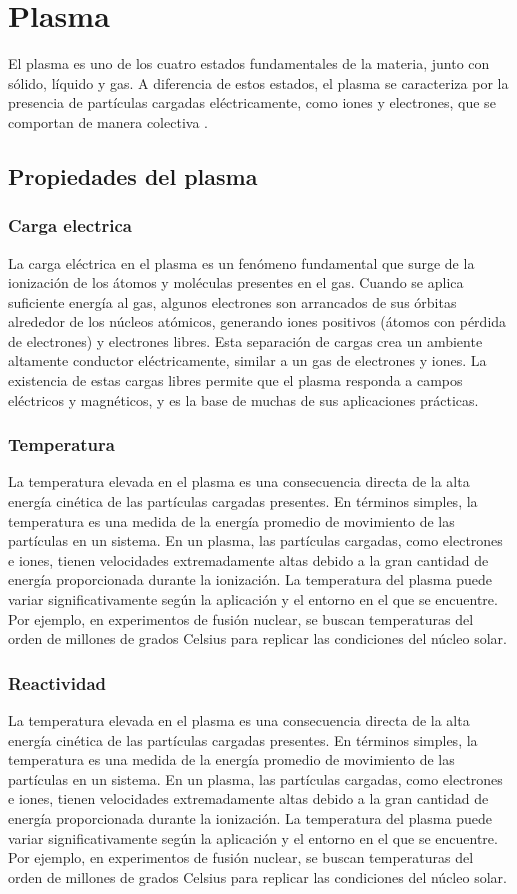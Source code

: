 \section{Plasma}
El plasma es uno de los cuatro estados fundamentales de la materia, junto con sólido, líquido y gas. A diferencia de estos estados, el plasma se caracteriza por la presencia de partículas cargadas eléctricamente, como iones y electrones, que se comportan de manera colectiva \cite{plasma1}.
\subsection{Propiedades del plasma}
    \subsubsection{Carga electrica}
    La carga eléctrica en el plasma es un fenómeno fundamental que surge de la ionización de los átomos y moléculas presentes en el gas. Cuando se aplica suficiente energía al gas, algunos electrones son arrancados de sus órbitas alrededor de los núcleos atómicos, generando iones positivos (átomos con pérdida de electrones) y electrones libres. Esta separación de cargas crea un ambiente altamente conductor eléctricamente, similar a un gas de electrones y iones. La existencia de estas cargas libres permite que el plasma responda a campos eléctricos y magnéticos, y es la base de muchas de sus aplicaciones prácticas.
    \subsubsection{Temperatura}
    La temperatura elevada en el plasma es una consecuencia directa de la alta energía cinética de las partículas cargadas presentes. En términos simples, la temperatura es una medida de la energía promedio de movimiento de las partículas en un sistema. En un plasma, las partículas cargadas, como electrones e iones, tienen velocidades extremadamente altas debido a la gran cantidad de energía proporcionada durante la ionización. La temperatura del plasma puede variar significativamente según la aplicación y el entorno en el que se encuentre. Por ejemplo, en experimentos de fusión nuclear, se buscan temperaturas del orden de millones de grados Celsius para replicar las condiciones del núcleo solar.
    \subsubsection{Reactividad}
    La temperatura elevada en el plasma es una consecuencia directa de la alta energía cinética de las partículas cargadas presentes. En términos simples, la temperatura es una medida de la energía promedio de movimiento de las partículas en un sistema. En un plasma, las partículas cargadas, como electrones e iones, tienen velocidades extremadamente altas debido a la gran cantidad de energía proporcionada durante la ionización. La temperatura del plasma puede variar significativamente según la aplicación y el entorno en el que se encuentre. Por ejemplo, en experimentos de fusión nuclear, se buscan temperaturas del orden de millones de grados Celsius para replicar las condiciones del núcleo solar.
